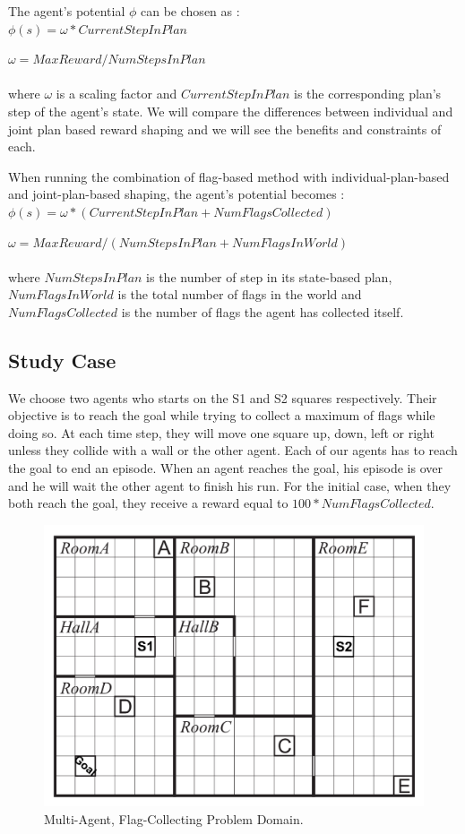 \documentclass[letterpaper]{article}
\begin{document}
The agent's potential $\phi$ can be chosen as :\\

$\phi (s) = \omega * CurrentStepInPlan$

$\omega = MaxReward/NumStepsInPlan$\\\\
where $\omega$ is a scaling factor and $CurrentStepInPlan$ is the corresponding plan's step of the agent's state. We will compare the differences between individual and joint plan based reward shaping and we will see the benefits and constraints of each.

When running the combination of flag-based method with individual-plan-based and joint-plan-based shaping, the agent's potential becomes :\\

$\phi (s) = \omega * (CurrentStepInPlan + NumFlagsCollected)$

$\omega = MaxReward/(NumStepsInPlan + NumFlagsInWorld)$\\\\
where $NumStepsInPlan$ is the number of step in its state-based plan, $NumFlagsInWorld$ is the total number of flags in the world and $NumFlagsCollected$ is the number of flags the agent has collected itself.

\subsection{Study Case}

We choose two agents who starts on the S1 and S2 squares respectively. Their objective is to reach the goal while trying to collect a maximum of flags while doing so. At each time step, they will move one square up, down, left or right unless they collide with a wall or the other agent. Each of our agents has to reach the goal to end an episode. When an agent reaches the goal, his episode is over and he will wait the other agent to finish his run. For the initial case, when they both reach the goal, they receive a reward equal to $100*NumFlagsCollected$. 

\begin{figure}[h!]
\centering
  \includegraphics[width=0.75\linewidth]{img/stydyCase.png}
  \caption{Multi-Agent, Flag-Collecting Problem Domain.}
  \label{fig:studycase1}
\end{figure}
\end{document}
